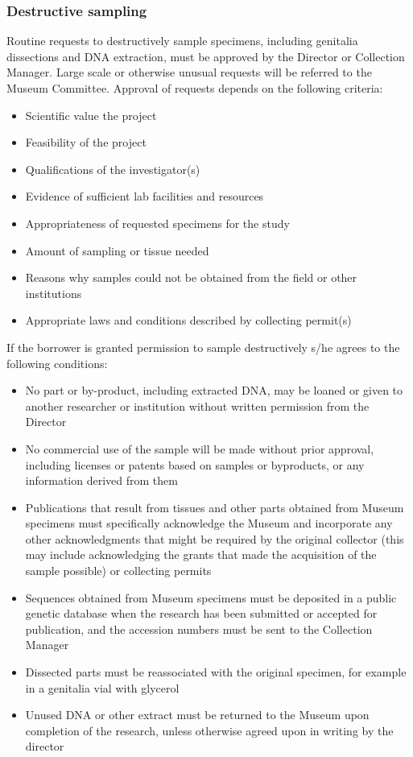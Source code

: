 \documentclass[letterpaper, 11pt]{article}
\begin{document}
\subsubsection{Destructive sampling}
Routine requests to destructively sample specimens, including genitalia dissections and DNA extraction, must be approved by the Director or Collection Manager. Large scale or otherwise unusual requests will be referred to the Museum Committee. Approval of requests depends on the following criteria:
\begin{itemize}
\item Scientific value the project
\item Feasibility of the project
\item Qualifications of the investigator(s)
\item Evidence of sufficient lab facilities and resources
\item Appropriateness of requested specimens for the study
\item Amount of sampling or tissue needed
\item Reasons why samples could not be obtained from the field or other institutions
\item Appropriate laws and conditions described by collecting permit(s)
\end{itemize}
\noindent{}If the borrower is granted permission to sample destructively s/he agrees to the following conditions:
\begin{itemize}
\item No part or by-product, including extracted DNA, may be loaned or given to another researcher or institution without written permission from the Director
\item No commercial use of the sample will be made without prior approval, including licenses or patents based on samples or byproducts, or any information derived from them
\item Publications that result from tissues and other parts obtained from Museum specimens must specifically acknowledge the Museum and incorporate any other acknowledgments that might be required by the original collector (this may include acknowledging the grants that made the acquisition of the sample possible) or collecting permits
\item Sequences obtained from Museum specimens must be deposited in a public genetic database when the research has been submitted or accepted for publication, and the accession numbers must be sent to the Collection Manager
\item Dissected parts must be reassociated with the original specimen, for example in a genitalia vial with glycerol
\item Unused DNA or other extract must be returned to the Museum upon completion of the research, unless otherwise agreed upon in writing by the director
\end{itemize}
\end{document}
